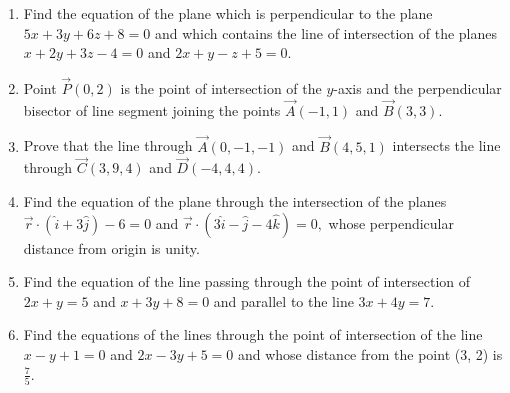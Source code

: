\begin{enumerate}[label=\thesubsection.\arabic*, ref=\thesubsection.\theenumi]
\item Find the equation of the plane which is perpendicular to the plane $5x+3y+6z+8=0$ and which contains the line of intersection of the planes $x+2y+3z-4=0$ and $2x+y-z+5=0.$
\item  Point $\vec{P}(0, 2)$ is the point of intersection of the $y$-axis and the perpendicular bisector of line segment joining the points $\vec{A}(-1, 1) $ and $ \vec{B}(3, 3)$.
\item Prove that the line through $\vec{A}(0, -1, -1)$ and $\vec{B}(4, 5, 1)$ intersects the line through $\vec{C}(3, 9, 4)$ and $\vec{D}(-4, 4, 4)$.
\item Find the equation of the plane through the intersection of the planes $\overrightarrow{r} \cdot (\hat{i}+3\hat{j}) - 6=0$ and $\overrightarrow{r} \cdot (3\hat{i}-\hat{j}-4\hat{k})=0, $ whose perpendicular distance from origin is unity.
\item Find the equation of the line passing through the point of intersection of $2x+y=5$ and $x+3y+8=0$ and parallel to the line $3x+4y=7$.
\item Find the equations of the lines through the point of intersection of the line $x-y+1=0 $ and $2x-3y+5=0$ and whose distance from the point (3, 2) is $\frac{7}{5}$.
\end{enumerate}
